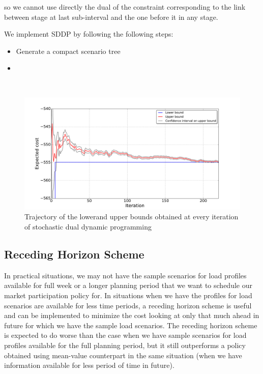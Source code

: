 \documentclass[11pt,twoside]{article}
\begin{document}
so we cannot use directly the dual of the constraint corresponding to the link between stage at last sub-interval and the one before it in any stage. 

We implement SDDP by following the following steps:
\begin{itemize}
\item Generate a compact scenario tree
\item  
\end{itemize}
\

\begin{figure}[h!]
\begin{center}
\includegraphics[scale=0.4]
{Figures/Plots/dualdynamic/bounds.pdf} \caption{Trajectory of the lowerand upper bounds obtained at every iteration of stochastic dual dynamic programming}\label{fig:bounds}\end{center}
\end{figure}

\FloatBarrier
\subsection{Receding Horizon Scheme}
In practical situations, we may not have the sample scenarios for load profiles available for full week or a longer planning period that we want to schedule our market participation policy for. In situations when we have the profiles for load scenarios are available for less time periods, a receding horizon scheme is useful and can be implemented to minimize the cost looking at only that much ahead in future for which we have the sample load scenarios. The receding horizon scheme is expected to do worse than the case when we have sample scenarios for load profiles available for the full planning period, but it still outperforms a policy obtained using mean-value counterpart in the same situation (when we have information available for less period of time in future). 
\end{document}
